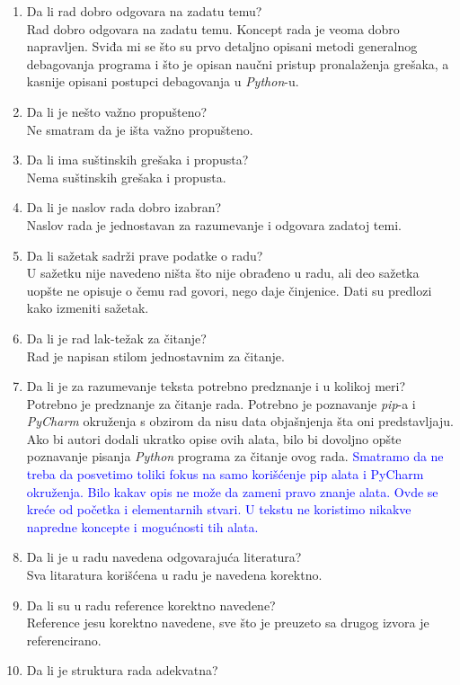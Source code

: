 \documentclass[a4paper]{report}
\newcommand{\odgovor}[1]{\textcolor{blue}{#1}}
\begin{document}
\begin{enumerate}
\item Da li rad dobro odgovara na zadatu temu?\\
Rad dobro odgovara na zadatu temu. Koncept rada je veoma dobro napravljen. Sviđa mi se što su prvo detaljno opisani metodi generalnog debagovanja programa i što je opisan naučni pristup pronalaženja grešaka, a kasnije opisani postupci debagovanja u \emph{Python}-u.
\item Da li je nešto važno propušteno?\\
Ne smatram da je išta važno propušteno.
\item Da li ima suštinskih grešaka i propusta?\\
Nema suštinskih grešaka i propusta.
\item Da li je naslov rada dobro izabran?\\
Naslov rada je jednostavan za razumevanje i odgovara zadatoj temi.
\item Da li sažetak sadrži prave podatke o radu?\\
U sažetku nije navedeno ništa što nije obrađeno u radu, ali deo sažetka uopšte ne opisuje o čemu rad govori, nego daje činjenice. Dati su predlozi kako izmeniti sažetak.
\item Da li je rad lak-težak za čitanje?\\
Rad je napisan stilom jednostavnim za čitanje.
\item Da li je za razumevanje teksta potrebno predznanje i u kolikoj meri?\\
Potrebno je predznanje za čitanje rada. Potrebno je poznavanje \emph{pip}-a i \emph{PyCharm} okruženja s obzirom da nisu data objašnjenja šta oni predstavljaju. Ako bi autori dodali ukratko opise ovih alata, bilo bi dovoljno opšte poznavanje pisanja \emph{Python} programa za čitanje ovog rada.
\odgovor{Smatramo da ne treba da posvetimo toliki fokus na samo korišćenje pip alata i PyCharm okruženja. Bilo kakav opis ne može da zameni pravo znanje alata. Ovde se kreće od početka i elementarnih stvari. U tekstu ne koristimo nikakve napredne koncepte i mogućnosti tih alata.}
\item Da li je u radu navedena odgovarajuća literatura?\\
Sva litaratura korišćena u radu je navedena korektno.
\item Da li su u radu reference korektno navedene?\\
Reference jesu korektno navedene, sve što je preuzeto sa drugog izvora je referencirano.
\item Da li je struktura rada adekvatna?\\

\end{enumerate}
\end{document}
